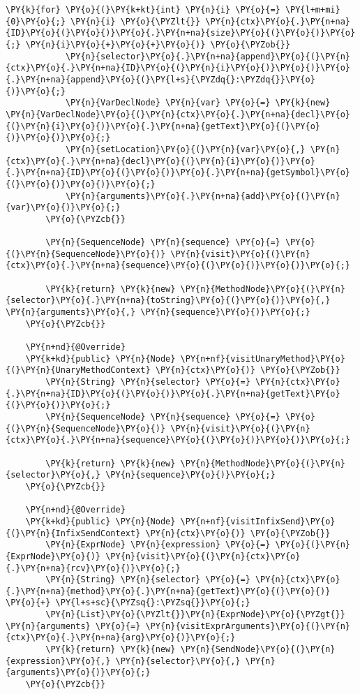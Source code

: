 \begin{Verbatim}[commandchars=\\\{\}]
        \PY{k}{for} \PY{o}{(}\PY{k+kt}{int} \PY{n}{i} \PY{o}{=} \PY{l+m+mi}{0}\PY{o}{;} \PY{n}{i} \PY{o}{\PYZlt{}} \PY{n}{ctx}\PY{o}{.}\PY{n+na}{ID}\PY{o}{(}\PY{o}{)}\PY{o}{.}\PY{n+na}{size}\PY{o}{(}\PY{o}{)}\PY{o}{;} \PY{n}{i}\PY{o}{+}\PY{o}{+}\PY{o}{)} \PY{o}{\PYZob{}}
            \PY{n}{selector}\PY{o}{.}\PY{n+na}{append}\PY{o}{(}\PY{n}{ctx}\PY{o}{.}\PY{n+na}{ID}\PY{o}{(}\PY{n}{i}\PY{o}{)}\PY{o}{)}\PY{o}{.}\PY{n+na}{append}\PY{o}{(}\PY{l+s}{\PYZdq{}:\PYZdq{}}\PY{o}{)}\PY{o}{;}
            \PY{n}{VarDeclNode} \PY{n}{var} \PY{o}{=} \PY{k}{new} \PY{n}{VarDeclNode}\PY{o}{(}\PY{n}{ctx}\PY{o}{.}\PY{n+na}{decl}\PY{o}{(}\PY{n}{i}\PY{o}{)}\PY{o}{.}\PY{n+na}{getText}\PY{o}{(}\PY{o}{)}\PY{o}{)}\PY{o}{;}
            \PY{n}{setLocation}\PY{o}{(}\PY{n}{var}\PY{o}{,} \PY{n}{ctx}\PY{o}{.}\PY{n+na}{decl}\PY{o}{(}\PY{n}{i}\PY{o}{)}\PY{o}{.}\PY{n+na}{ID}\PY{o}{(}\PY{o}{)}\PY{o}{.}\PY{n+na}{getSymbol}\PY{o}{(}\PY{o}{)}\PY{o}{)}\PY{o}{;}
            \PY{n}{arguments}\PY{o}{.}\PY{n+na}{add}\PY{o}{(}\PY{n}{var}\PY{o}{)}\PY{o}{;}
        \PY{o}{\PYZcb{}}

        \PY{n}{SequenceNode} \PY{n}{sequence} \PY{o}{=} \PY{o}{(}\PY{n}{SequenceNode}\PY{o}{)} \PY{n}{visit}\PY{o}{(}\PY{n}{ctx}\PY{o}{.}\PY{n+na}{sequence}\PY{o}{(}\PY{o}{)}\PY{o}{)}\PY{o}{;}

        \PY{k}{return} \PY{k}{new} \PY{n}{MethodNode}\PY{o}{(}\PY{n}{selector}\PY{o}{.}\PY{n+na}{toString}\PY{o}{(}\PY{o}{)}\PY{o}{,} \PY{n}{arguments}\PY{o}{,} \PY{n}{sequence}\PY{o}{)}\PY{o}{;}
    \PY{o}{\PYZcb{}}
    
    \PY{n+nd}{@Override}
    \PY{k+kd}{public} \PY{n}{Node} \PY{n+nf}{visitUnaryMethod}\PY{o}{(}\PY{n}{UnaryMethodContext} \PY{n}{ctx}\PY{o}{)} \PY{o}{\PYZob{}}
        \PY{n}{String} \PY{n}{selector} \PY{o}{=} \PY{n}{ctx}\PY{o}{.}\PY{n+na}{ID}\PY{o}{(}\PY{o}{)}\PY{o}{.}\PY{n+na}{getText}\PY{o}{(}\PY{o}{)}\PY{o}{;}
        \PY{n}{SequenceNode} \PY{n}{sequence} \PY{o}{=} \PY{o}{(}\PY{n}{SequenceNode}\PY{o}{)} \PY{n}{visit}\PY{o}{(}\PY{n}{ctx}\PY{o}{.}\PY{n+na}{sequence}\PY{o}{(}\PY{o}{)}\PY{o}{)}\PY{o}{;}

        \PY{k}{return} \PY{k}{new} \PY{n}{MethodNode}\PY{o}{(}\PY{n}{selector}\PY{o}{,} \PY{n}{sequence}\PY{o}{)}\PY{o}{;}
    \PY{o}{\PYZcb{}}

    \PY{n+nd}{@Override}
    \PY{k+kd}{public} \PY{n}{Node} \PY{n+nf}{visitInfixSend}\PY{o}{(}\PY{n}{InfixSendContext} \PY{n}{ctx}\PY{o}{)} \PY{o}{\PYZob{}}
        \PY{n}{ExprNode} \PY{n}{expression} \PY{o}{=} \PY{o}{(}\PY{n}{ExprNode}\PY{o}{)} \PY{n}{visit}\PY{o}{(}\PY{n}{ctx}\PY{o}{.}\PY{n+na}{rcv}\PY{o}{)}\PY{o}{;}
        \PY{n}{String} \PY{n}{selector} \PY{o}{=} \PY{n}{ctx}\PY{o}{.}\PY{n+na}{method}\PY{o}{.}\PY{n+na}{getText}\PY{o}{(}\PY{o}{)} \PY{o}{+} \PY{l+s+sc}{\PYZsq{}:\PYZsq{}}\PY{o}{;}
        \PY{n}{List}\PY{o}{\PYZlt{}}\PY{n}{ExprNode}\PY{o}{\PYZgt{}} \PY{n}{arguments} \PY{o}{=} \PY{n}{visitExprArguments}\PY{o}{(}\PY{n}{ctx}\PY{o}{.}\PY{n+na}{arg}\PY{o}{)}\PY{o}{;}
        \PY{k}{return} \PY{k}{new} \PY{n}{SendNode}\PY{o}{(}\PY{n}{expression}\PY{o}{,} \PY{n}{selector}\PY{o}{,} \PY{n}{arguments}\PY{o}{)}\PY{o}{;}
    \PY{o}{\PYZcb{}}


\end{Verbatim}
